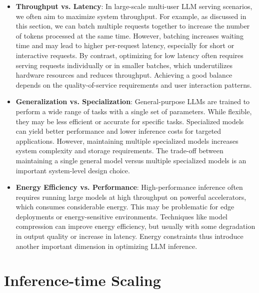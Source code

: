 \begin{itemize}
\item \vspace{0.5em} \textbf{Throughput vs. Latency}: In large-scale multi-user LLM serving scenarios, we often aim to maximize system throughput. For example, as discussed in this section, we can batch multiple requests together to increase the number of tokens processed at the same time. However, batching increases waiting time and may lead to higher per-request latency, especially for short or interactive requests. By contrast, optimizing for low latency often requires serving requests individually or in smaller batches, which underutilizes hardware resources and reduces throughput. Achieving a good balance depends on the quality-of-service requirements and user interaction patterns.
\item \vspace{0.3cm} \textbf{Generalization vs. Specialization}: General-purpose LLMs are trained to perform a wide range of tasks with a single set of parameters. While flexible, they may be less efficient or accurate for specific tasks. Specialized models can yield better performance and lower inference costs for targeted applications. However, maintaining multiple specialized models increases system complexity and storage requirements. The trade-off between maintaining a single general model versus multiple specialized models is an important system-level design choice.
\item \vspace{0.3em} \textbf{Energy Efficiency vs. Performance}: High-performance inference often requires running large models at high throughput on powerful accelerators, which consumes considerable energy. This may be problematic for edge deployments or energy-sensitive environments. Techniques like model compression can improve energy efficiency, but usually with some degradation in output quality or increase in latency. Energy constraints thus introduce another important dimension in optimizing LLM inference.
\end{itemize}
\vspace{0.5em}


\section{Inference-time Scaling}

